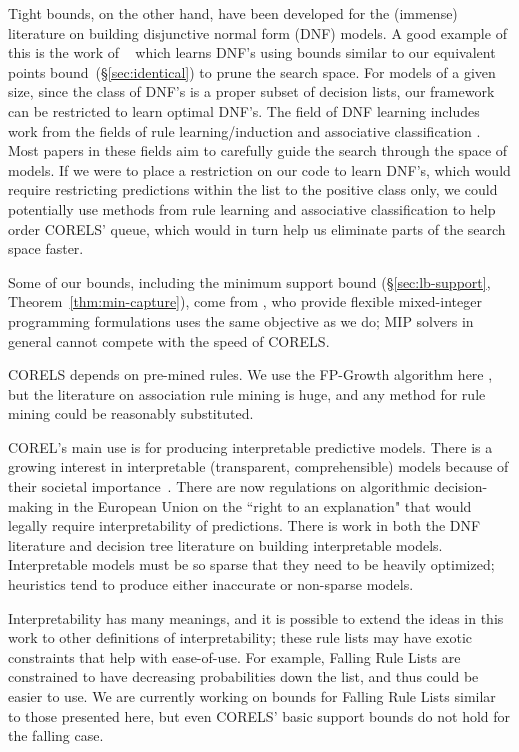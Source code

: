 Tight bounds, on the other hand, have been developed for the (immense) literature on building disjunctive normal form (DNF) models. A good example of this is the work of ~\citet{Rijnbeek10} which learns DNF's using bounds similar to our equivalent points bound~(\S\ref{sec:identical}) to prune the search space.  For models of a given size, since the class of DNF's is a proper subset of decision lists, our framework can be restricted to learn optimal DNF's. The field of DNF learning includes work from the fields of rule learning/induction  \citep[e.g., early algorithms ][]{Michalski1969,ClarkNiblett1989,Frank1998} and associative classification \citep[][]{Vanhoof10}. Most papers in these fields aim to carefully guide the search through the space of models. If we were to place a restriction on our code to learn DNF's, which would require restricting predictions within the list to the positive class only, we could potentially use methods from rule learning and associative classification to help order CORELS' queue, which would in turn help us eliminate parts of the search space faster. 

Some of our bounds, including the minimum support bound (\S\ref{sec:lb-support}, Theorem~\ref{thm:min-capture}), come from \citep{RudinEr15}, who provide flexible mixed-integer programming formulations uses the same objective as we do; MIP solvers in general cannot compete with the speed of CORELS.

CORELS depends on pre-mined rules. We use the FP-Growth algorithm here \cite{FP}, but the literature on association rule mining is huge, and any method for rule mining could be reasonably substituted.

COREL's main use is for producing interpretable predictive models. There is a growing interest in interpretable (transparent, comprehensible) models because of their societal importance~\citep[see ][]{ruping2006learning,bratko1997machine,dawes1979robust,VellidoEtAl12,Giraud98,Holte93,Schmueli10,Huysmans11,Freitas14}. There are now regulations on algorithmic decision-making in the European Union on the ``right to an explanation" \citep{Goodman2016EU} that would legally require interpretability of predictions. There is work in both the DNF literature \citep{Ruckert}and decision tree literature \cite{GarofalakisHyRaSh00} on building interpretable models. Interpretable models must be so sparse that they need to be heavily optimized; heuristics tend to produce either inaccurate or non-sparse models.

Interpretability has many meanings, and it is possible to extend the ideas in this work to other definitions of interpretability; these rule lists may have exotic constraints that help with ease-of-use. For example, Falling Rule Lists \citep{WangRu15} are constrained to have decreasing probabilities down the list, and thus could be easier to use. We are currently working on bounds for Falling Rule Lists \citep{ChenRu17} similar to those presented here, but even CORELS' basic support bounds do not hold for the falling case. 

